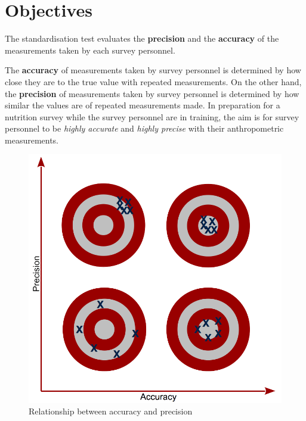 \documentclass[
  12pt,
]{book}
\begin{document}
\hypertarget{objectives}{%
\section{Objectives}\label{objectives}}

The standardisation test evaluates the \textbf{precision} and the \textbf{accuracy} of the measurements taken by each survey personnel.

The \textbf{accuracy} of measurements taken by survey personnel is determined by how close they are to the true value with repeated measurements. On the other hand, the \textbf{precision} of measurements taken by survey personnel is determined by how similar the values are of repeated measurements made. In preparation for a nutrition survey while the survey personnel are in training, the aim is for survey personnel to be \emph{highly accurate} and \emph{highly precise} with their anthropometric measurements.

\begin{figure}

{\centering \includegraphics[width=11.11in]{images/accuracyPrecision} 

}

\caption{Relationship between accuracy and precision}\label{fig:standard01}
\end{figure}
\end{document}
